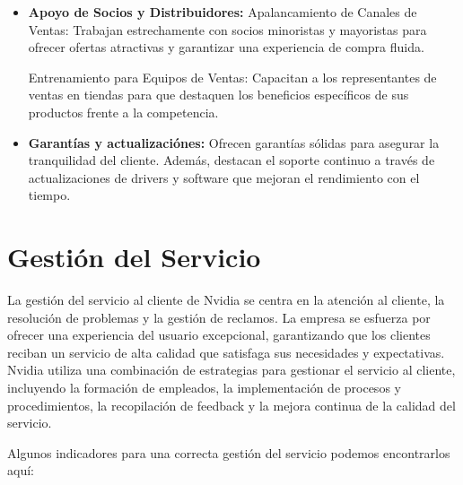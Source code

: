 \documentclass{article}
\begin{document}
\begin{itemize}
  \item \textbf{Apoyo de Socios y Distribuidores:} Apalancamiento de Canales de Ventas: Trabajan estrechamente con socios minoristas y mayoristas para ofrecer ofertas atractivas y garantizar una experiencia de compra fluida. 

  Entrenamiento para Equipos de Ventas: Capacitan a los representantes de ventas en tiendas para que destaquen los beneficios específicos de sus productos frente a la competencia. 

  \item \textbf{Garantías y actualizaciónes:} Ofrecen garantías sólidas para asegurar la tranquilidad del cliente. Además, destacan el soporte continuo a través de actualizaciones de drivers y software que mejoran el rendimiento con el tiempo. 
  
\end{itemize}


\newpage

\section{Gestión del Servicio}

La gestión del servicio al cliente de Nvidia se centra en la atención al cliente, la resolución de problemas y la gestión de reclamos. La empresa se esfuerza por ofrecer una experiencia del usuario excepcional, garantizando que los clientes reciban un servicio de alta calidad que satisfaga sus necesidades y expectativas. Nvidia utiliza una combinación de estrategias para gestionar el servicio al cliente, incluyendo la formación de empleados, la implementación de procesos y procedimientos, la recopilación de feedback y la mejora continua de la calidad del servicio.
  
Algunos indicadores para una correcta gestión del servicio podemos encontrarlos aquí:
\end{document}
